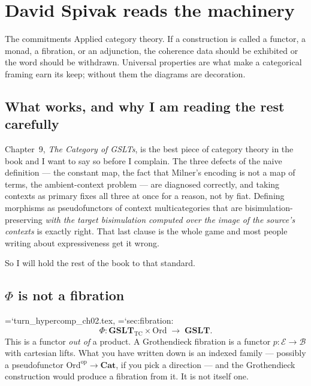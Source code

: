 \documentclass[11pt,letterpaper]{article}
\newcommand{\loc}[1]{{\small\ttfamily\color{accent}\hyphenchar\font=`\-\relax #1}}
\begin{document}
\clearpage
\tableofcontents
\clearpage

\section{David Spivak reads the machinery}

\begin{voice}{The commitments}
Applied category theory. If a construction is called a functor, a
monad, a fibration, or an adjunction, the coherence data should be
exhibited or the word should be withdrawn. Universal properties are
what make a categorical framing earn its keep; without them the
diagrams are decoration.
\end{voice}

\subsection*{What works, and why I am reading the rest carefully}

Chapter~9, \emph{The Category of GSLTs}, is the best piece of
category theory in the book and I want to say so before I complain.
The three defects of the naive definition --- the constant map, the
fact that Milner's encoding is not a map of terms, the ambient-context
problem --- are diagnosed correctly, and taking contexts as primary
fixes all three at once for a reason, not by fiat. Defining morphisms
as pseudofunctors of context multicategories that are
bisimulation-preserving \emph{with the target bisimulation computed
over the image of the source's contexts} is exactly right. That last
clause is the whole game and most people writing about expressiveness
get it wrong.

So I will hold the rest of the book to that standard.

\subsection*{$\Phi$ is not a fibration}

\loc{turn\_hypercomp\_ch02.tex}, \loc{sec:fibration}:
\[
  \Phi : \mathbf{GSLT}_{\mathrm{TC}} \times \mathrm{Ord}
  \;\longrightarrow\; \mathbf{GSLT}.
\]
This is a functor \emph{out of} a product. A Grothendieck fibration is
a functor $p : \mathcal{E} \to \mathcal{B}$ with cartesian lifts. What
you have written down is an indexed family --- possibly a pseudofunctor
$\mathrm{Ord}^{\mathrm{op}} \to \mathbf{Cat}$, if you pick a direction
--- and the Grothendieck construction would produce a fibration from
it. It is not itself one.
\end{document}
